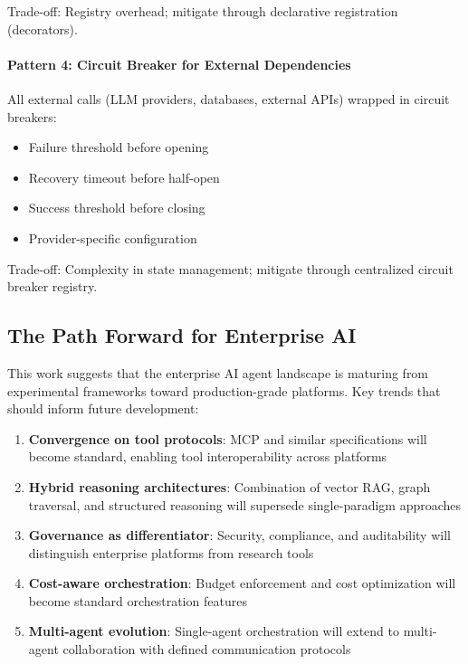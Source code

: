 Trade-off: Registry overhead; mitigate through declarative registration (decorators).

\paragraph{Pattern 4: Circuit Breaker for External Dependencies}
All external calls (LLM providers, databases, external APIs) wrapped in circuit breakers:
\begin{itemize}
    \item Failure threshold before opening
    \item Recovery timeout before half-open
    \item Success threshold before closing
    \item Provider-specific configuration
\end{itemize}

Trade-off: Complexity in state management; mitigate through centralized circuit breaker registry.

\subsection{The Path Forward for Enterprise AI}

This work suggests that the enterprise AI agent landscape is maturing from experimental frameworks toward production-grade platforms. Key trends that should inform future development:

\begin{enumerate}
    \item \textbf{Convergence on tool protocols}: MCP and similar specifications will become standard, enabling tool interoperability across platforms
    \item \textbf{Hybrid reasoning architectures}: Combination of vector RAG, graph traversal, and structured reasoning will supersede single-paradigm approaches
    \item \textbf{Governance as differentiator}: Security, compliance, and auditability will distinguish enterprise platforms from research tools
    \item \textbf{Cost-aware orchestration}: Budget enforcement and cost optimization will become standard orchestration features
    \item \textbf{Multi-agent evolution}: Single-agent orchestration will extend to multi-agent collaboration with defined communication protocols
\end{enumerate}

